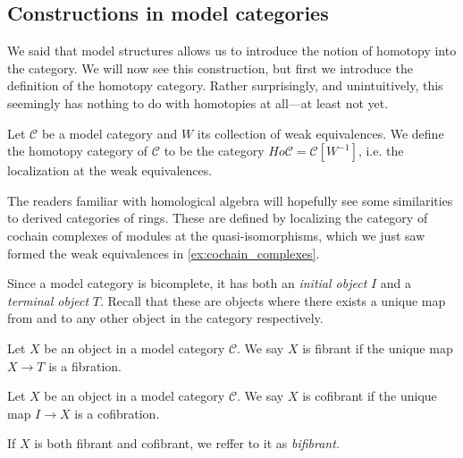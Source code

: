 \subsection{Constructions in model categories}

We said that model structures allows us to introduce the notion of homotopy into the category. We will now see this construction, but first we introduce the definition of the homotopy category. Rather surprisingly, and unintuitively, this seemingly has nothing to do with homotopies at all---at least not yet. 

\begin{definition}
\label{def:homotopy_category}
Let $\mathcal{C}$ be a model category and $W$ its collection of weak equivalences. We define the homotopy category of $\mathcal{C}$ to be the category $Ho\mathcal{C} = \mathcal{C}[W^{-1}]$, i.e. the localization at the weak equivalences. 
\end{definition}

\begin{remark}
The readers familiar with homological algebra will hopefully see some similarities to derived categories of rings. These are defined by localizing the category of cochain complexes of modules at the quasi-isomorphisms, which we just saw formed the weak equivalences in \cref{ex:cochain_complexes}. 
\end{remark}

Since a model category is bicomplete, it has both an \emph{initial object} $I$ and a \emph{terminal object} $T$. Recall that these are objects where there exists a unique map from and to any other object in the category respectively. 

\begin{definition}
\label{def:fibrant}
Let $X$ be an object in a model category $\mathcal{C}$. We say $X$ is fibrant if the unique map $X\longrightarrow T$ is a fibration. 
\end{definition}

\begin{definition}
\label{def:cofibrant}
Let $X$ be an object in a model category $\mathcal{C}$. We say $X$ is cofibrant if the unique map $I\longrightarrow X$ is a cofibration. 
\end{definition}

If $X$ is both fibrant and cofibrant, we reffer to it as \emph{bifibrant}. 



